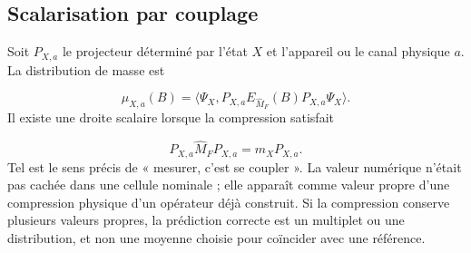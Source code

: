 \subsection{Scalarisation par couplage}
Soit \(P_{X,a}\) le projecteur déterminé par l'état \(X\) et l'appareil ou le canal physique \(a\). La distribution de masse est

\[
\mu_{X,a}(B)
=\langle\Psi_X,
P_{X,a}E_{\widehat M_F}(B)P_{X,a}\Psi_X\rangle.
\]
Il existe une droite scalaire lorsque la compression satisfait

\[
P_{X,a}\widehat M_FP_{X,a}=m_XP_{X,a}.
\]
Tel est le sens précis de « mesurer, c'est se coupler ». La valeur numérique n'était pas cachée dans une cellule nominale ; elle apparaît comme valeur propre d'une compression physique d'un opérateur déjà construit. Si la compression conserve plusieurs valeurs propres, la prédiction correcte est un multiplet ou une distribution, et non une moyenne choisie pour coïncider avec une référence.


